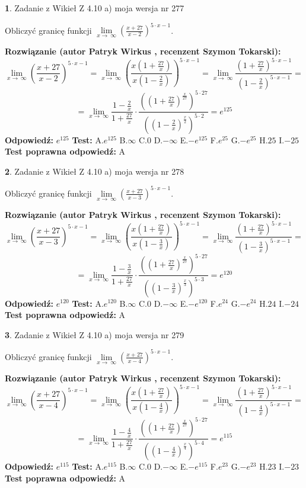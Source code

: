 \documentclass[12pt, a4paper]{article}
\theoremstyle{definition} %
\newtheorem{zad}{}
\newcommand{\zadStart}[1]{\begin{zad}#1\newline}
\newcommand{\zadStop}{\end{zad}}
\newcommand{\rozwStart}[2]{\noindent \textbf{Rozwiązanie (autor #1 , recenzent #2): }\newline}
\newcommand{\rozwStop}{\newline}
\newcommand{\odpStart}{\noindent \textbf{Odpowiedź:}\newline}
\newcommand{\odpStop}{\newline}
\newcommand{\testStart}{\noindent \textbf{Test:}\newline}
\newcommand{\testStop}{\newline}
\newcommand{\kluczStart}{\noindent \textbf{Test poprawna odpowiedź:}\newline}
\newcommand{\kluczStop}{\newline}
\begin{document}
\zadStart{Zadanie z Wikieł Z 4.10 a) moja wersja nr 277}

Obliczyć granicę funkcji  $\lim\limits_{x\to\ \infty}(\frac{x+27}{x-2})^{5\cdot x-1}$.
\zadStop
\rozwStart{Patryk Wirkus}{Szymon Tokarski}
$$\lim\limits_{x\to\ \infty}(\frac{x+27}{x-2})^{5\cdot x-1} = \lim\limits_{x\to\ \infty}(\frac{x(1+\frac{27}{x})}{x(1-\frac{2}{x})})^{5\cdot x-1}=\lim\limits_{x\to\ \infty}\frac{(1+\frac{27}{x})^{5\cdot x-1}}{(1-\frac{2}{x})^{5\cdot x-1}}=$$
$$=\lim\limits_{x\to\ \infty}\frac{1-\frac{2}{x}}{1+\frac{27}{x}}\cdot\frac{((1+\frac{27}{x})^{\frac{x}{27}})^{5\cdot27}}{((1-\frac{2}{x})^{\frac{x}{2}})^{5\cdot2}}=e^{125}$$
\rozwStop
\odpStart
$e^{125}$
\odpStop
\testStart
A.$e^{125}$ B.$\infty$ C.$0$ D.$-\infty$ E.$-e^{125}$
F.$e^{25}$ G.$-e^{25}$
H.$25$
I.$-25$
\testStop
\kluczStart
A
\kluczStop



\zadStart{Zadanie z Wikieł Z 4.10 a) moja wersja nr 278}

Obliczyć granicę funkcji  $\lim\limits_{x\to\ \infty}(\frac{x+27}{x-3})^{5\cdot x-1}$.
\zadStop
\rozwStart{Patryk Wirkus}{Szymon Tokarski}
$$\lim\limits_{x\to\ \infty}(\frac{x+27}{x-3})^{5\cdot x-1} = \lim\limits_{x\to\ \infty}(\frac{x(1+\frac{27}{x})}{x(1-\frac{3}{x})})^{5\cdot x-1}=\lim\limits_{x\to\ \infty}\frac{(1+\frac{27}{x})^{5\cdot x-1}}{(1-\frac{3}{x})^{5\cdot x-1}}=$$
$$=\lim\limits_{x\to\ \infty}\frac{1-\frac{3}{x}}{1+\frac{27}{x}}\cdot\frac{((1+\frac{27}{x})^{\frac{x}{27}})^{5\cdot27}}{((1-\frac{3}{x})^{\frac{x}{3}})^{5\cdot3}}=e^{120}$$
\rozwStop
\odpStart
$e^{120}$
\odpStop
\testStart
A.$e^{120}$ B.$\infty$ C.$0$ D.$-\infty$ E.$-e^{120}$
F.$e^{24}$ G.$-e^{24}$
H.$24$
I.$-24$
\testStop
\kluczStart
A
\kluczStop



\zadStart{Zadanie z Wikieł Z 4.10 a) moja wersja nr 279}

Obliczyć granicę funkcji  $\lim\limits_{x\to\ \infty}(\frac{x+27}{x-4})^{5\cdot x-1}$.
\zadStop
\rozwStart{Patryk Wirkus}{Szymon Tokarski}
$$\lim\limits_{x\to\ \infty}(\frac{x+27}{x-4})^{5\cdot x-1} = \lim\limits_{x\to\ \infty}(\frac{x(1+\frac{27}{x})}{x(1-\frac{4}{x})})^{5\cdot x-1}=\lim\limits_{x\to\ \infty}\frac{(1+\frac{27}{x})^{5\cdot x-1}}{(1-\frac{4}{x})^{5\cdot x-1}}=$$
$$=\lim\limits_{x\to\ \infty}\frac{1-\frac{4}{x}}{1+\frac{27}{x}}\cdot\frac{((1+\frac{27}{x})^{\frac{x}{27}})^{5\cdot27}}{((1-\frac{4}{x})^{\frac{x}{4}})^{5\cdot4}}=e^{115}$$
\rozwStop
\odpStart
$e^{115}$
\odpStop
\testStart
A.$e^{115}$ B.$\infty$ C.$0$ D.$-\infty$ E.$-e^{115}$
F.$e^{23}$ G.$-e^{23}$
H.$23$
I.$-23$
\testStop
\kluczStart
A
\kluczStop
\end{document}
